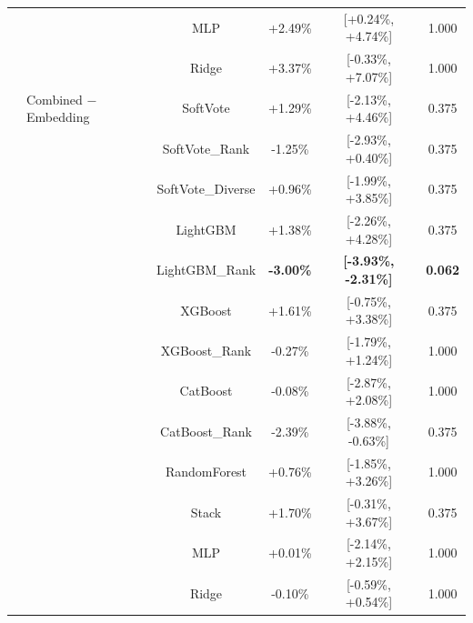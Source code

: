 \documentclass[10pt,journal,compsoc]{IEEEtran}
\begin{document}
\begin{table}[tbp]
\begin{tabular}{llcccc}
               &                          & MLP                & +2.49\%                & [+0.24\%, +4.74\%]               & 1.000      \\
               &                          & Ridge              & +3.37\%                & [-0.33\%, +7.07\%]               & 1.000      \\
               & Combined $-$ Embedding   & SoftVote           & +1.29\%                & [-2.13\%, +4.46\%]               & 0.375      \\
               &                          & SoftVote\_Rank     & -1.25\%                & [-2.93\%, +0.40\%]               & 0.375      \\
               &                          & SoftVote\_Diverse  & +0.96\%                & [-1.99\%, +3.85\%]               & 0.375      \\
               &                          & LightGBM           & +1.38\%                & [-2.26\%, +4.28\%]               & 0.375      \\
               &                          & LightGBM\_Rank     & \textbf{-3.00\%}       & \textbf{[-3.93\%, -2.31\%]}      & \textbf{0.062} \\
               &                          & XGBoost            & +1.61\%                & [-0.75\%, +3.38\%]               & 0.375      \\
               &                          & XGBoost\_Rank      & -0.27\%                & [-1.79\%, +1.24\%]               & 1.000      \\
               &                          & CatBoost           & -0.08\%                & [-2.87\%, +2.08\%]               & 1.000      \\
               &                          & CatBoost\_Rank     & -2.39\%                & [-3.88\%, -0.63\%]               & 0.375      \\
               &                          & RandomForest       & +0.76\%                & [-1.85\%, +3.26\%]               & 1.000      \\
               &                          & Stack              & +1.70\%                & [-0.31\%, +3.67\%]               & 0.375      \\
               &                          & MLP                & +0.01\%                & [-2.14\%, +2.15\%]               & 1.000      \\
               &                          & Ridge              & -0.10\%                & [-0.59\%, +0.54\%]               & 1.000      \\

\end{tabular}
\end{table}
\end{document}
